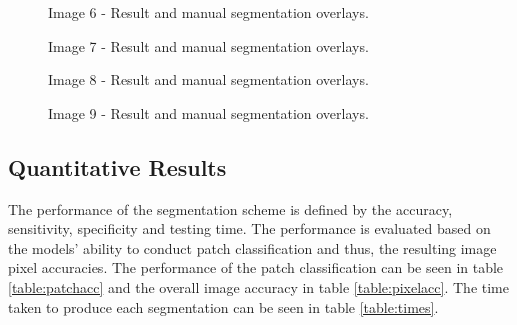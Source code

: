 \begin{figure}[H]
    \centering
    \quad
    \caption{Image 6 - Result and manual segmentation overlays.}%
    \label{fig:overlay6}
\end{figure}
 
 \begin{figure}[H]
    \centering
    \quad
    \caption{Image 7 - Result and manual segmentation overlays.}%
    \label{fig:overlay7}
\end{figure}

\begin{figure}[H]
    \centering
    \quad
    \caption{Image 8 - Result and manual segmentation overlays.}%
    \label{fig:overlay8}
\end{figure}

\begin{figure}[H]
    \centering
    \quad
    \caption{Image 9 - Result and manual segmentation overlays.}%
    \label{fig:overlay9}
\end{figure}
 
 
\subsection{Quantitative Results}

The performance of the segmentation scheme is defined by the accuracy, sensitivity, specificity and testing time. The performance is evaluated based on the models' ability to conduct patch classification and thus, the resulting image pixel accuracies. The performance of the patch classification can be seen in table \ref{table:patchacc} and the overall image accuracy in table \ref{table:pixelacc}. The time taken to produce each segmentation can be seen in table \ref{table:times}.


